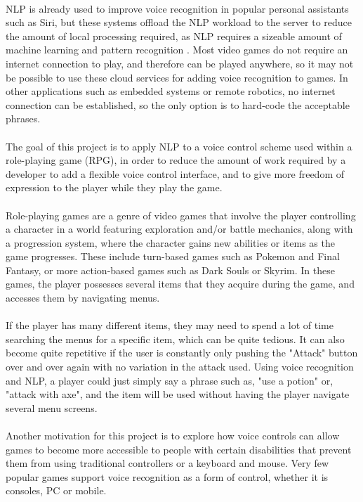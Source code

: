 \documentclass[12pt]{article}
\begin{document}
\\
NLP is already used to improve voice recognition in popular personal assistants such as Siri, but these systems offload the NLP workload to the server to reduce the amount of local processing required, as NLP requires a sizeable amount of machine learning and pattern recognition \cite{RefWorks:21}. Most video games do not require an internet connection to play, and therefore can be played anywhere, so it may not be possible to use these cloud services for adding voice recognition to games. In other applications such as embedded systems or remote robotics, no internet connection can be established, so the only option is to hard-code the acceptable phrases.
\\
\\
The goal of this project is to apply NLP to a voice control scheme used within a role-playing game (RPG), in order to reduce the amount of work required by a developer to add a flexible voice control interface, and to give more freedom of expression to the player while they play the game.
\\
\\
Role-playing games are a genre of video games that involve the player controlling a character in a world featuring exploration and/or battle mechanics, along with a progression system, where the character gains new abilities or items as the game progresses. These include turn-based games such as Pokemon and Final Fantasy, or more action-based games such as Dark Souls or Skyrim. In these games, the player possesses several items that they acquire during the game, and accesses them by navigating menus.
\\
\\
If the player has many different items, they may need to spend a lot of time searching the menus for a specific item, which can be quite tedious. It can also become quite repetitive if the user is constantly only pushing the "Attack" button over and over again with no variation in the attack used. Using voice recognition and NLP, a player could just simply say a phrase such as, "use a potion" or, "attack with axe", and the item will be used without having the player navigate several menu screens.
\\
\\
Another motivation for this project is to explore how voice controls can allow games to become more accessible to people with certain disabilities that prevent them from using traditional controllers or a keyboard and mouse. Very few popular games support voice recognition as a form of control, whether it is consoles, PC or mobile.
\end{document}
